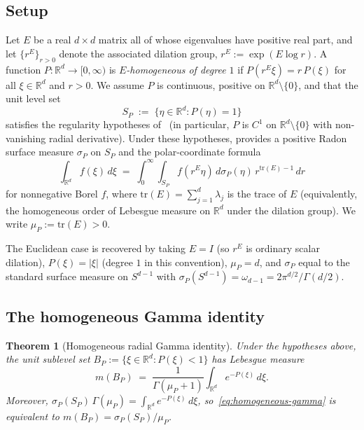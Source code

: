 \documentclass[11pt,a4paper]{article}
\theoremstyle{plain}
\newtheorem{theorem}{Theorem}[section]
\theoremstyle{definition}
\theoremstyle{remark}
\newcommand{\R}{\mathbb{R}}
\begin{document}
\subsection*{Setup}

Let $E$ be a real $d\times d$ matrix all of whose eigenvalues have positive real part, and let $\{r^E\}_{r>0}$ denote the associated dilation group, $r^E := \exp(E\log r)$. A function $P\colon\R^d\to[0,\infty)$ is \emph{$E$-homogeneous of degree $1$} if $P(r^E\xi) = r\,P(\xi)$ for all $\xi\in\R^d$ and $r>0$. We assume $P$ is continuous, positive on $\R^d\setminus\{0\}$, and that the unit level set
\[
S_P \;:=\; \{\eta\in\R^d : P(\eta)=1\}
\]
satisfies the regularity hypotheses of~\cite[Thm.~1]{BuiRandles2022} (in particular, $P$ is $C^1$ on $\R^d\setminus\{0\}$ with non-vanishing radial derivative). Under these hypotheses, \cite[Thm.~1]{BuiRandles2022} provides a positive Radon surface measure $\sigma_P$ on $S_P$ and the polar-coordinate formula
\begin{equation}\label{eq:bui-randles-polar}
\int_{\R^d} f(\xi)\,d\xi \;=\; \int_0^\infty\!\int_{S_P} f(r^E\eta)\,d\sigma_P(\eta)\,r^{\mathrm{tr}(E)-1}\,dr
\end{equation}
for nonnegative Borel $f$, where $\mathrm{tr}(E) = \sum_{j=1}^d \lambda_j$ is the trace of $E$ (equivalently, the homogeneous order of Lebesgue measure on $\R^d$ under the dilation group). We write $\mu_P := \mathrm{tr}(E) > 0$.

The Euclidean case is recovered by taking $E=I$ (so $r^E$ is ordinary scalar dilation), $P(\xi) = |\xi|$ (degree $1$ in this convention), $\mu_P = d$, and $\sigma_P$ equal to the standard surface measure on $S^{d-1}$ with $\sigma_P(S^{d-1}) = \omega_{d-1} = 2\pi^{d/2}/\Gamma(d/2)$.

\subsection*{The homogeneous Gamma identity}

\begin{theorem}[Homogeneous radial Gamma identity]\label{thm:homogeneous}
Under the hypotheses above, the unit sublevel set $B_P := \{\xi\in\R^d : P(\xi)<1\}$ has Lebesgue measure
\begin{equation}\label{eq:homogeneous-gamma}
m(B_P) \;=\; \frac{1}{\Gamma(\mu_P+1)}\int_{\R^d} e^{-P(\xi)}\,d\xi.
\end{equation}
Moreover, $\sigma_P(S_P)\,\Gamma(\mu_P) = \int_{\R^d} e^{-P(\xi)}\,d\xi$, so~\eqref{eq:homogeneous-gamma} is equivalent to $m(B_P) = \sigma_P(S_P)/\mu_P$.
\end{theorem}
\end{document}
